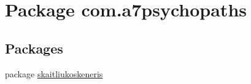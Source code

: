 \hypertarget{namespacecom_1_1a7psychopaths}{}\section{Package com.\+a7psychopaths}
\label{namespacecom_1_1a7psychopaths}
\subsection*{Packages}
\begin{DoxyCompactItemize}
\item 
package \mbox{\hyperlink{namespacecom_1_1a7psychopaths_1_1skaitliukoskeneris}{skaitliukoskeneris}}
\end{DoxyCompactItemize}
